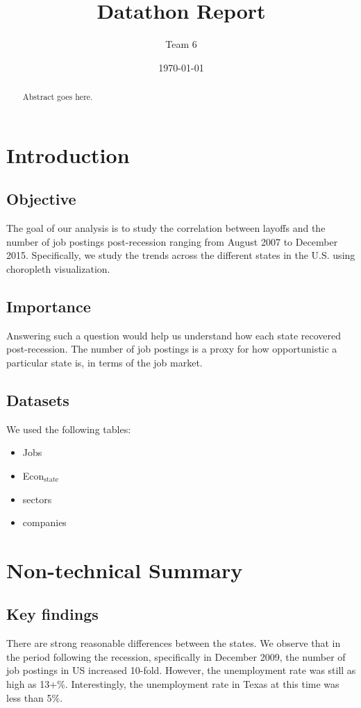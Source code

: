 \documentclass[11pt]{article}
\author{Team 6}
\date{\today}
\title{Datathon Report}
\begin{document}
\maketitle
\begin{abstract}
Abstract goes here.
\end{abstract}

\section{Introduction}
\label{sec-1}
\subsection{Objective}
\label{sec-1-1}
The goal of our analysis is to study the correlation between layoffs
and the number of job postings post-recession ranging from August 2007
to December 2015. Specifically, we study the trends across the
different states in the U.S. using choropleth visualization. 

\subsection{Importance}
\label{sec-1-2}
Answering such a question would help us understand how each state
recovered post-recession. The number of job postings is a proxy for
how opportunistic a particular state is, in terms of the job market. 

\subsection{Datasets}
\label{sec-1-3}
We used the following tables:
\begin{itemize}
\item Jobs
\item Econ$_{\text{state}}$
\item sectors
\item companies
\end{itemize}
\section{Non-technical Summary}
\label{sec-2}
\subsection{Key findings}
\label{sec-2-1}
There are strong reasonable differences between the states. We observe
that in the period following the recession, specifically in December
2009, the number of job postings in US increased 10-fold. However, the
unemployment rate was still as high as 13+\%. Interestingly, the
unemployment rate in Texas at this time was less than 5\%.
\end{document}
